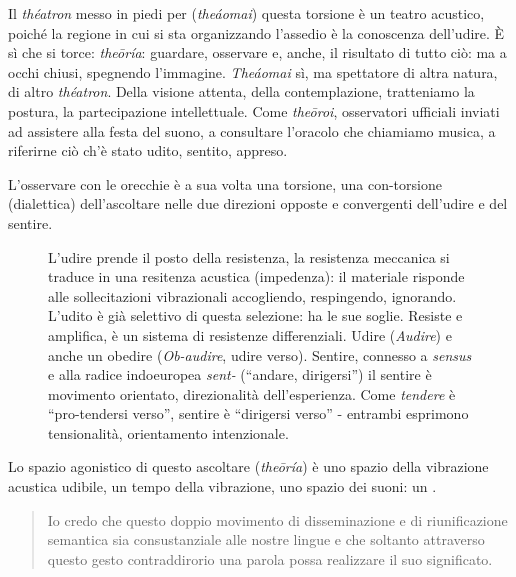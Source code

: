 Il \emph{théatron} messo in piedi per (\emph{theáomai}) questa torsione è un
teatro acustico, poiché la regione in cui si sta organizzando l'assedio è la
conoscenza dell'udire. È sì che si torce: \emph{theōría}: guardare, osservare e,
anche, il risultato di tutto ciò: ma a occhi chiusi, spegnendo l'immagine.
\emph{Theáomai} sì, ma spettatore di altra natura, di altro \emph{théatron}.
Della visione attenta, della contemplazione, tratteniamo la postura, la
partecipazione intellettuale. Come \emph{theōroi}, osservatori ufficiali inviati
ad assistere alla festa del suono, a consultare l'oracolo che chiamiamo musica,
a riferirne ciò ch'è stato udito, sentito, appreso.

L'osservare con le orecchie è a sua volta una torsione, una con-torsione
(dialettica) dell'ascoltare nelle due direzioni opposte e convergenti dell'udire
e del sentire.

\begin{figure}[htbp]
\begin{center}
\caption{L'udire prende il posto della resistenza, la resistenza meccanica si
traduce in una resitenza acustica (impedenza): il materiale risponde alle
sollecitazioni vibrazionali accogliendo, respingendo, ignorando. L'udito è già
selettivo di questa selezione: ha le sue soglie. Resiste e amplifica, è un
sistema di resistenze differenziali. Udire (\emph{Audire}) e anche un obedire
(\emph{Ob-audire}, udire verso). Sentire, connesso a \emph{sensus} e alla radice
indoeuropea \emph{sent-} (“andare, dirigersi”) il sentire è movimento orientato,
direzionalità dell'esperienza. Come \emph{tendere} è “pro-tendersi verso”,
sentire è “dirigersi verso” - entrambi esprimono tensionalità, orientamento
intenzionale.}
\label{ascoltare}
\end{center}
\end{figure}

Lo spazio agonistico \cite{ronchi2001} di questo ascoltare (\emph{theōría}) è
uno spazio della vibrazione acustica udibile, un tempo della vibrazione, uno
spazio dei suoni: un .

\begin{quote}
\begin{sf}
\small
  Io credo che questo doppio movimento di disseminazione e di riunificazione
  semantica sia consustanziale alle nostre lingue e che soltanto attraverso
  questo gesto contraddirorio una parola possa realizzare il suo significato.
  \cite{agamben17}
  \end{sf}
\end{quote}


